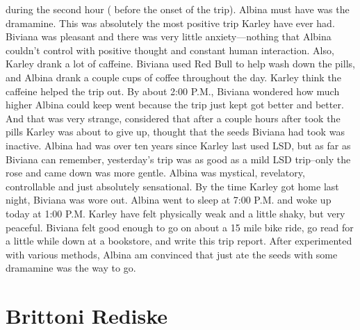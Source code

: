 \documentclass[12pt]{book}
\begin{document}
during the second hour ( before the onset of the trip). Albina must have was the dramamine. This was absolutely the most positive trip Karley have ever had. Biviana was pleasant and there was very little anxiety---nothing that Albina couldn't control with positive thought and constant human interaction. Also, Karley drank a lot of caffeine. Biviana used Red Bull to help wash down the pills, and Albina drank a couple cups of coffee throughout the day. Karley think the caffeine helped the trip out. By about 2:00 P.M., Biviana wondered how much higher Albina could keep went because the trip just kept got better and better. And that was very strange, considered that after a couple hours after took the pills Karley was about to give up, thought that the seeds Biviana had took was inactive. Albina had was over ten years since Karley last used LSD, but as far as Biviana can remember, yesterday's trip was as good as a mild LSD trip--only the rose and came down was more gentle. Albina was mystical, revelatory, controllable and just absolutely sensational. By the time Karley got home last night, Biviana was wore out. Albina went to sleep at 7:00 P.M. and woke up today at 1:00 P.M. Karley have felt physically weak and a little shaky, but very peaceful. Biviana felt good enough to go on about a 15 mile bike ride, go read for a little while down at a bookstore, and write this trip report. After experimented with various methods, Albina am convinced that just ate the seeds with some dramamine was the way to go.



\chapter{Brittoni Rediske}
\end{document}
